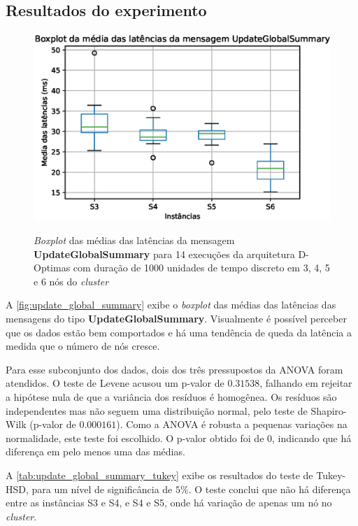 \subsection{Resultados do experimento}
\label{sec:resultado}

\begin{figure}
    \centering
    \caption{\textit{Boxplot} das médias das latências da mensagem \textbf{UpdateGlobalSummary} para 14 execuções da arquitetura D-Optimas com duração de 1000 unidades de tempo discreto em 3, 4, 5 e 6 nós do \textit{cluster} }
    \includegraphics[scale=0.8]{imagens/update_global_summary.eps}
    \label{fig:update_global_summary}
\end{figure}

A \autoref{fig:update_global_summary} exibe o \textit{boxplot} das médias das latências das mensagens do tipo \textbf{UpdateGlobalSummary}. Visualmente é possível perceber que os dados estão bem comportados e há uma tendência de queda da latência a medida que o número de nós cresce. 

Para esse subconjunto dos dados, dois dos três pressupostos da ANOVA foram atendidos. O teste de Levene acusou um p-valor de $0.31538$, falhando em rejeitar a hipótese nula de que a variância dos resíduos é homogênea. Os resíduos são independentes mas não seguem uma distribuição normal, pelo teste de Shapiro-Wilk (p-valor de $0.000161$). Como a ANOVA é robusta a pequenas variações na normalidade, este teste foi escolhido. O p-valor obtido foi de $0$, indicando que há diferença em pelo menos uma das médias. 

A \autoref{tab:update_global_summary_tukey} exibe os resultados do teste de Tukey-HSD, para um nível de significância de $5\%$. O teste conclui que não há diferença entre as instâncias S3 e S4, e S4 e S5, onde há variação de apenas um nó no \textit{cluster}.


